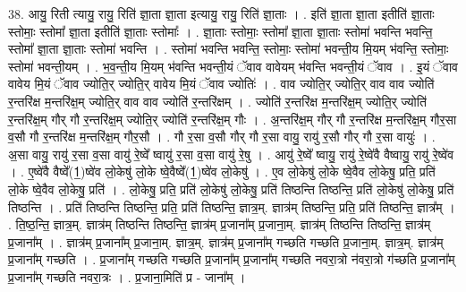 \documentclass[17pt]{extarticle}
\begin{document}
38. आयु॒ रिती त्यायु॒ रायु॒ रिति॑ ज्ञा॒ता ज्ञा॒ता इत्यायु॒ रायु॒ रिति॑ ज्ञा॒ताः । . इति॑ ज्ञा॒ता ज्ञा॒ता इतीति॑ ज्ञा॒ताः स्तोमाः॒ स्तोमा᳚ ज्ञा॒ता इतीति॑ ज्ञा॒ताः स्तोमाः᳚ । . ज्ञा॒ताः स्तोमाः॒ स्तोमा᳚ ज्ञा॒ता ज्ञा॒ताः स्तोमा॑ भवन्ति भवन्ति॒ स्तोमा᳚ ज्ञा॒ता ज्ञा॒ताः स्तोमा॑ भवन्ति । . स्तोमा॑ भवन्ति भवन्ति॒ स्तोमाः॒ स्तोमा॑ भवन्ती॒य मि॒यम् भ॑वन्ति॒ स्तोमाः॒ स्तोमा॑ भवन्ती॒यम् । . भ॒व॒न्ती॒य मि॒यम् भ॑वन्ति भवन्ती॒यं ॅवाव वावेयम् भ॑वन्ति भवन्ती॒यं ॅवाव । . इ॒यं ॅवाव वावेय मि॒यं ॅवाव ज्योति॒र् ज्योति॒र् वावेय मि॒यं ॅवाव ज्योतिः॑ । . वाव ज्योति॒र् ज्योति॒र् वाव वाव ज्योति॑ र॒न्तरि॑क्ष म॒न्तरि॑क्ष॒म् ज्योति॒र् वाव वाव ज्योति॑ र॒न्तरि॑क्षम् । . ज्योति॑ र॒न्तरि॑क्ष म॒न्तरि॑क्ष॒म् ज्योति॒र् ज्योति॑ र॒न्तरि॑क्ष॒म् गौर् गौ र॒न्तरि॑क्ष॒म् ज्योति॒र् ज्योति॑ र॒न्तरि॑क्ष॒म् गौः । . अ॒न्तरि॑क्ष॒म् गौर् गौ र॒न्तरि॑क्ष म॒न्तरि॑क्ष॒म् गौर॒सा व॒सौ गौ र॒न्तरि॑क्ष म॒न्तरि॑क्ष॒म् गौर॒सौ । . गौ र॒सा व॒सौ गौर् गौ र॒सा वायु॒ रायु॑ र॒सौ गौर् गौ र॒सा वायुः॑ । . अ॒सा वायु॒ रायु॑ र॒सा व॒सा वायु॑ रे॒ष्वे᳚ ष्वायु॑ र॒सा व॒सा वायु॑ रे॒षु । . आयु॑ रे॒ष्वे᳚ ष्वायु॒ रायु॑ रे॒ष्वे॑वै वैष्वायु॒ रायु॑ रे॒ष्वे॑व । . ए॒ष्वे॑वै वैष्वे᳚(1॒)ष्वे॑व लो॒केषु॑ लो॒के ष्वे॒वैष्वे᳚(1॒)ष्वे॑व लो॒केषु॑ । . ए॒व लो॒केषु॑ लो॒के ष्वे॒वैव लो॒केषु॒ प्रति॒ प्रति॑ लो॒के ष्वे॒वैव लो॒केषु॒ प्रति॑ । . लो॒केषु॒ प्रति॒ प्रति॑ लो॒केषु॑ लो॒केषु॒ प्रति॑ तिष्ठन्ति तिष्ठन्ति॒ प्रति॑ लो॒केषु॑ लो॒केषु॒ प्रति॑ तिष्ठन्ति । . प्रति॑ तिष्ठन्ति तिष्ठन्ति॒ प्रति॒ प्रति॑ तिष्ठन्ति॒ ज्ञात्र॒म्. ज्ञात्र॑म् तिष्ठन्ति॒ प्रति॒ प्रति॑ तिष्ठन्ति॒ ज्ञात्र᳚म् । . ति॒ष्ठ॒न्ति॒ ज्ञात्र॒म्. ज्ञात्र॑म् तिष्ठन्ति तिष्ठन्ति॒ ज्ञात्र॑म् प्र॒जाना᳚म् प्र॒जाना॒म्. ज्ञात्र॑म् तिष्ठन्ति तिष्ठन्ति॒ ज्ञात्र॑म् प्र॒जाना᳚म् । . ज्ञात्र॑म् प्र॒जाना᳚म् प्र॒जाना॒म्. ज्ञात्र॒म्. ज्ञात्र॑म् प्र॒जाना᳚म् गच्छति गच्छति प्र॒जाना॒म्. ज्ञात्र॒म्. ज्ञात्र॑म् प्र॒जाना᳚म् गच्छति । . प्र॒जाना᳚म् गच्छति गच्छति प्र॒जाना᳚म् प्र॒जाना᳚म् गच्छति नवरा॒त्रो न॑वरा॒त्रो ग॑च्छति प्र॒जाना᳚म् प्र॒जाना᳚म् गच्छति नवरा॒त्रः । . प्र॒जाना॒मिति॑ प्र - जाना᳚म् । \newline
\pagebreak
{}
\end{document}
